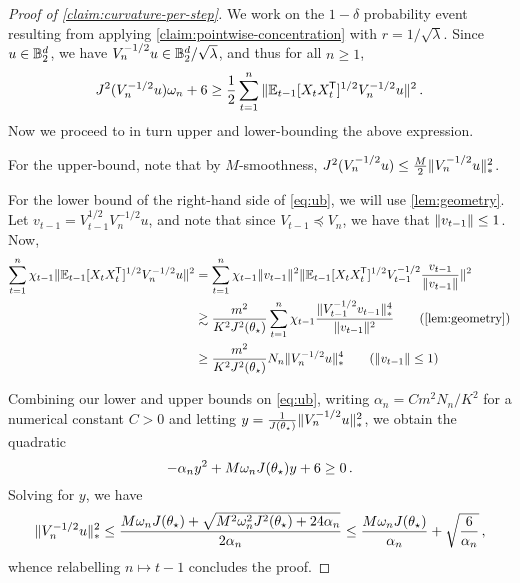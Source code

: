 \begin{proof}[Proof of \cref{claim:curvature-per-step}]
We work on the $1-\delta$ probability event resulting from applying \cref{claim:pointwise-concentration} with $r = 1/\sqrt{\lambda}$. Since $u \in \mathbb{B}^d_2$, we have $V_{n}^{-1/2} u \in \mathbb{B}^d_2/\sqrt{\lambda}$, and thus 
for all $n \geq 1$,
\begin{align}
     J^2(V^{-1/2}_n u) \omega_n + 6  \geq \frac{1}{2}\sum_{t=1}^n \|\mathbb{E}_{t-1}[ X_tX_t^{\mkern-1.5mu\mathsf{T}}]^{1/2} V^{-1/2}_n u\|^2\,. \label{eq:ub}
\end{align}
Now we proceed to in turn upper and lower-bounding the above expression.

For the upper-bound, note that by $M$-smoothness, $J^2(V^{-1/2}_n u) \leq \frac{M}{2} \|V^{-1/2}_n u\|_{*}^2$.

For the lower bound of the right-hand side of \cref{eq:ub}, we will use \cref{lem:geometry}. Let $v_{t-1} = V^{1/2}_{t-1} V^{-1/2}_{n} u$, and note that since $V_{t-1} \preceq V_n$, we have that $\|v_{t-1}\| \leq 1$. Now,
\begin{align*}
    \sum_{t=1}^n \chip \norm{\Et[ \Xt\Xt\tran]^{1/2} V^{-1/2}_n u}^2  
    &= \sum_{t=1}^n \chip \norm{v_{t-1}}^2\norm{\Et[ \Xt\Xt\tran]^{1/2} \Vt^{-1/2} \frac{v_{t-1}}{\norm{v_{t-1}}}}^2 \\ 
    &\gtrsim \frac{m^2}{K^2 J^2(\thetaopt)} \sum_{t=1}^n \chip \frac{\snorm{\Vt^{-1/2} v_{t-1} }^4}{\norm{v_{t-1}}^2} \tag{\cref{lem:geometry}} \\ 
    &\geq \frac{m^2}{K^2 J^2(\thetaopt)} N_n \snorm{V^{-1/2}_n u}^4  \tag{$\norm{v_{t-1}} \leq 1$}\, 
\end{align*}

Combining our lower and upper bounds on \cref{eq:ub}, writing $\alpha_n = C m^2 N_n / K^2$ for a numerical constant $C > 0$ and letting $y = \frac{1}{J(\theta_\star)}\|V^{-1/2}_n u\|_{*}^2$, we obtain the quadratic
$$
    - \alpha_n y^2 + M \omega_n J(\theta_\star)y + 6 \geq 0\,.
$$
Solving for $y$, we have
\begin{equation*}
    \|V^{-1/2}_n u\|_{*}^2 \leq \frac{M\omega_n J(\theta_\star) + \sqrt{M^2\omega_n^2 J^2(\theta_\star) + 24\alpha_n}}{2\alpha_n} \leq \frac{M\omega_n J(\theta_\star)}{\alpha_n} + \sqrt{\frac{6}{\alpha_n}}\,,
\end{equation*}
whence relabelling $n \mapsto t-1$ concludes the proof.
\end{proof}
